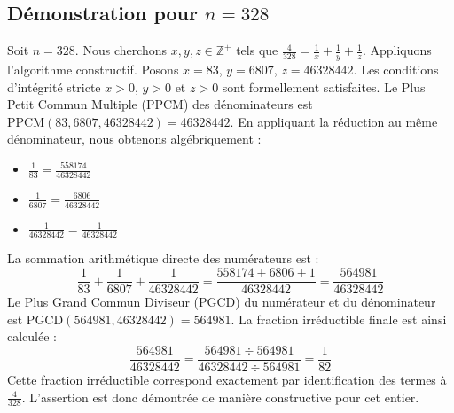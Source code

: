 \documentclass[11pt,a4paper]{article}
\begin{document}
\subsection{Démonstration pour $n = 328$}
Soit $n = 328$. Nous cherchons $x, y, z \in \mathbb{Z}^{+}$ tels que $\frac{4}{328} = \frac{1}{x} + \frac{1}{y} + \frac{1}{z}$.
Appliquons l'algorithme constructif. Posons $x = 83$, $y = 6807$, $z = 46328442$.
Les conditions d'intégrité stricte $x > 0$, $y > 0$ et $z > 0$ sont formellement satisfaites.
Le Plus Petit Commun Multiple (PPCM) des dénominateurs est $\text{PPCM}(83, 6807, 46328442) = 46328442$.
En appliquant la réduction au même dénominateur, nous obtenons algébriquement :
\begin{itemize}
    \item $\frac{1}{83} = \frac{558174}{46328442}$
    \item $\frac{1}{6807} = \frac{6806}{46328442}$
    \item $\frac{1}{46328442} = \frac{1}{46328442}$
\end{itemize}
La sommation arithmétique directe des numérateurs est :
$$ \frac{1}{83} + \frac{1}{6807} + \frac{1}{46328442} = \frac{558174 + 6806 + 1}{46328442} = \frac{564981}{46328442} $$
Le Plus Grand Commun Diviseur (PGCD) du numérateur et du dénominateur est $\text{PGCD}(564981, 46328442) = 564981$.
La fraction irréductible finale est ainsi calculée :
$$ \frac{564981}{46328442} = \frac{564981 \div 564981}{46328442 \div 564981} = \frac{1}{82} $$
Cette fraction irréductible correspond exactement par identification des termes à $\frac{4}{328}$. L'assertion est donc démontrée de manière constructive pour cet entier.
\end{document}
